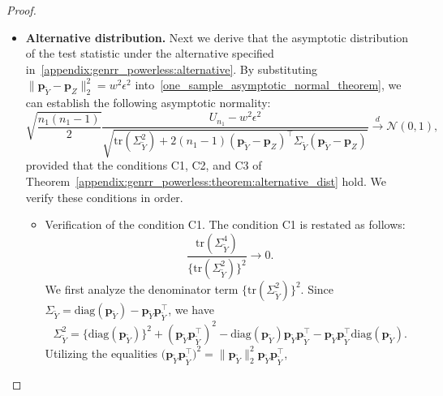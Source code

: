 \documentclass[twoside,11pt]{article}
\newcommand{\rvTwo}{Y}
\newcommand{\rvThree}{Z}
\newcommand{\sampleSize}{n}
\newcommand{\probVec}{\mathbf{p}} %
\begin{document}
\begin{appendix}
\begin{proof}
\begin{itemize}
		\item \textbf{Alternative distribution.}
		Next we derive that the asymptotic distribution of the test statistic under the alternative specified in~\eqref{appendix:genrr_powerless:alternative}.
		By substituting $
		\|
		\probVec_{\tilde{\rvTwo}}
		-
		\probVec_{\rvThree}
		\|_2^2 = w^2 \epsilon^2
		$
		into~\eqref{one_sample_asymptotic_normal_theorem},
		we can establish the following asymptotic normality:
		\begin{equation}\label{genrr_ustat_asympototic_dist}
			\sqrt{
				\frac{
					\sampleSize_1(\sampleSize_1-1)
				}{
					2
				} 
			}
			\frac{
				U_{\sampleSize_1}
				-
				w^2 \epsilon^2}{
				\sqrt{
					\mathrm{tr}(\Sigma_{\tilde{\rvTwo}}^2)
					+
					2(\sampleSize_1 - 1)
					(\probVec_{\tilde{\rvTwo}} - \probVec_\rvThree)^\top 
					\Sigma_{\tilde{\rvTwo}}
					(\probVec_{\tilde{\rvTwo}} - \probVec_\rvThree)	
				}
			}
			\stackrel{d}{\to}
			\mathcal{N}(0,1),
		\end{equation}
		provided that the conditions C1, C2, and C3 of  Theorem~\ref{appendix:genrr_powerless:theorem:alternative_dist} hold.
		We verify these conditions in order.
		\begin{itemize}
			\item Verification of the condition C1. The condition C1 is restated as follows:
			\begin{equation*}%
				\frac{
					\mathrm{tr}(\Sigma_{\tilde{\rvTwo}}^4)
				}{
					\bigl\{
					\mathrm{tr}(\Sigma_{\tilde{\rvTwo}}^2)
					\bigr\}^2   
				}
				\to
				0.
			\end{equation*}
			We first analyze the denominator term $\bigl\{
			\mathrm{tr}(\Sigma_{\tilde{\rvTwo}}^2)
			\bigr\}^2 $. Since $\Sigma_{\tilde{\rvTwo}}  = \mathrm{diag}(\probVec_{\tilde{\rvTwo}}) - \probVec_{\tilde{\rvTwo}} \probVec_{\tilde{\rvTwo}}^\top$,
			we have 
			\begin{equation*}%
				\Sigma_{\tilde{\rvTwo}}^2
				= 
				\{ \mathrm{diag}(\probVec_{\tilde{\rvTwo}})
				\}^2
				+
				( \probVec_{\tilde{\rvTwo}} \probVec_{\tilde{\rvTwo}}^\top )^2
				-
				\mathrm{diag}(\probVec_{\tilde{\rvTwo}})\probVec_{\tilde{\rvTwo}} \probVec_{\tilde{\rvTwo}}^\top
				-
				\probVec_{\tilde{\rvTwo}} \probVec_{\tilde{\rvTwo}}^\top
				\mathrm{diag}(\probVec_{\tilde{\rvTwo}})
				. 
			\end{equation*}
			\sloppy Utilizing the equalities
			$\bigl(\probVec_{\tilde{\rvTwo}} \probVec_{\tilde{\rvTwo}}^\top\bigr)^2 = \|\probVec_{\tilde{\rvTwo}}\|_2^2 \probVec_{\tilde{\rvTwo}} \probVec_{\tilde{\rvTwo}}^\top$,

\end{itemize}
\end{itemize}
\end{proof}
\end{appendix}
\end{document}
